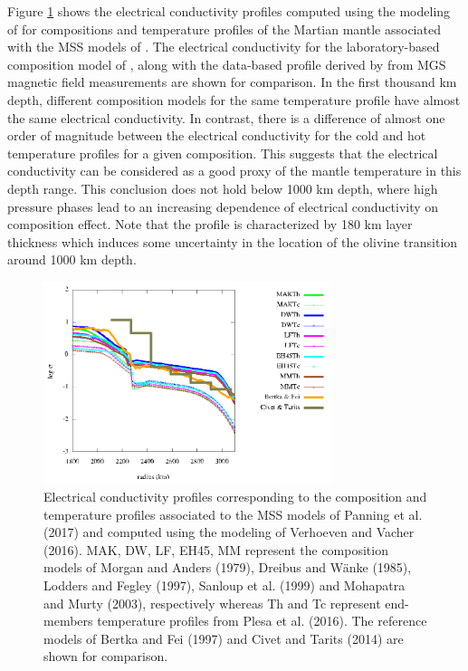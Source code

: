 Figure \ref{fig:conduct.png} shows the electrical conductivity profiles computed using the modeling of \cite{Verhoeven&Vacher2016} for compositions and temperature profiles of the Martian mantle associated with the MSS models of \cite{Panning2016}. The electrical conductivity for the laboratory-based composition model of \cite{Bertka1997}, along with the data-based profile derived by \cite{Civet&Tarits2014} from MGS magnetic field measurements are shown for comparison. In the first thousand km depth, different composition models for the same temperature profile have almost the same electrical conductivity. In contrast, there is a difference of almost one order of magnitude between the electrical conductivity for the cold and hot temperature profiles for a given composition. This suggests that the electrical conductivity can be considered as a good proxy of the mantle temperature in this depth range. This conclusion does not hold below 1000 km depth, where high pressure phases lead to an increasing dependence of electrical conductivity on composition effect. Note that the \cite{Civet&Tarits2014} profile is characterized by 180 km layer thickness which induces some uncertainty in the location of the olivine transition around 1000 km depth.


\begin{figure}[h!]
\begin{center}
\includegraphics[width=0.75\textwidth]
{figures/Figconduct.png}
\caption{Electrical conductivity profiles corresponding to the composition and temperature profiles associated to the MSS models of Panning et al. (2017) and computed using the modeling of Verhoeven and Vacher (2016). MAK, DW, LF, EH45, MM represent the composition models of Morgan and Anders (1979), Dreibus and W\"{a}nke (1985), Lodders and Fegley (1997), Sanloup et al. (1999) and Mohapatra and Murty (2003), respectively whereas Th and Tc represent end- members temperature profiles from Plesa et al. (2016). The reference models of Bertka and Fei (1997) and Civet and Tarits (2014) are shown for comparison.}
\label{fig:conduct.png} 
\end{center}
\end{figure} 

